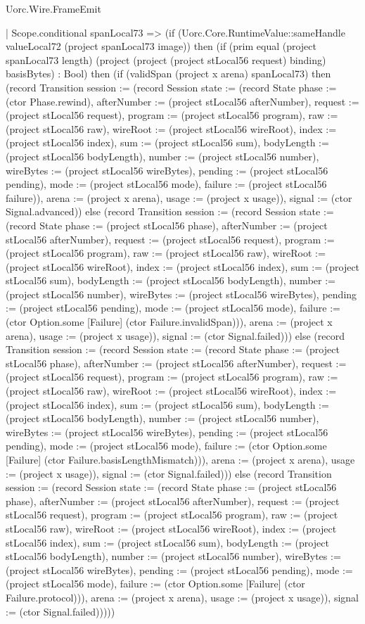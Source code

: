 \begin{lexlean}{Uorc.Wire.FrameEmit}
\begin{semanticmodule}
{            | Scope.conditional spanLocal73 => (if (Uorc.Core.RuntimeValue::sameHandle valueLocal72 (project spanLocal73 image)) then (if (prim equal (project spanLocal73 length) (project (project (project stLocal56 request) binding) basisBytes) : Bool) then (if (validSpan (project x arena) spanLocal73) then (record Transition {session := (record Session {state := (record State {phase := (ctor Phase.rewind), afterNumber := (project stLocal56 afterNumber), request := (project stLocal56 request), program := (project stLocal56 program), raw := (project stLocal56 raw), wireRoot := (project stLocal56 wireRoot), index := (project stLocal56 index), sum := (project stLocal56 sum), bodyLength := (project stLocal56 bodyLength), number := (project stLocal56 number), wireBytes := (project stLocal56 wireBytes), pending := (project stLocal56 pending), mode := (project stLocal56 mode), failure := (project stLocal56 failure)}), arena := (project x arena), usage := (project x usage)}), signal := (ctor Signal.advanced)}) else (record Transition {session := (record Session {state := (record State {phase := (project stLocal56 phase), afterNumber := (project stLocal56 afterNumber), request := (project stLocal56 request), program := (project stLocal56 program), raw := (project stLocal56 raw), wireRoot := (project stLocal56 wireRoot), index := (project stLocal56 index), sum := (project stLocal56 sum), bodyLength := (project stLocal56 bodyLength), number := (project stLocal56 number), wireBytes := (project stLocal56 wireBytes), pending := (project stLocal56 pending), mode := (project stLocal56 mode), failure := (ctor Option.some [Failure] (ctor Failure.invalidSpan))}), arena := (project x arena), usage := (project x usage)}), signal := (ctor Signal.failed)})) else (record Transition {session := (record Session {state := (record State {phase := (project stLocal56 phase), afterNumber := (project stLocal56 afterNumber), request := (project stLocal56 request), program := (project stLocal56 program), raw := (project stLocal56 raw), wireRoot := (project stLocal56 wireRoot), index := (project stLocal56 index), sum := (project stLocal56 sum), bodyLength := (project stLocal56 bodyLength), number := (project stLocal56 number), wireBytes := (project stLocal56 wireBytes), pending := (project stLocal56 pending), mode := (project stLocal56 mode), failure := (ctor Option.some [Failure] (ctor Failure.basisLengthMismatch))}), arena := (project x arena), usage := (project x usage)}), signal := (ctor Signal.failed)})) else (record Transition {session := (record Session {state := (record State {phase := (project stLocal56 phase), afterNumber := (project stLocal56 afterNumber), request := (project stLocal56 request), program := (project stLocal56 program), raw := (project stLocal56 raw), wireRoot := (project stLocal56 wireRoot), index := (project stLocal56 index), sum := (project stLocal56 sum), bodyLength := (project stLocal56 bodyLength), number := (project stLocal56 number), wireBytes := (project stLocal56 wireBytes), pending := (project stLocal56 pending), mode := (project stLocal56 mode), failure := (ctor Option.some [Failure] (ctor Failure.protocol))}), arena := (project x arena), usage := (project x usage)}), signal := (ctor Signal.failed)}))))
}
\end{semanticmodule}
\end{lexlean}
